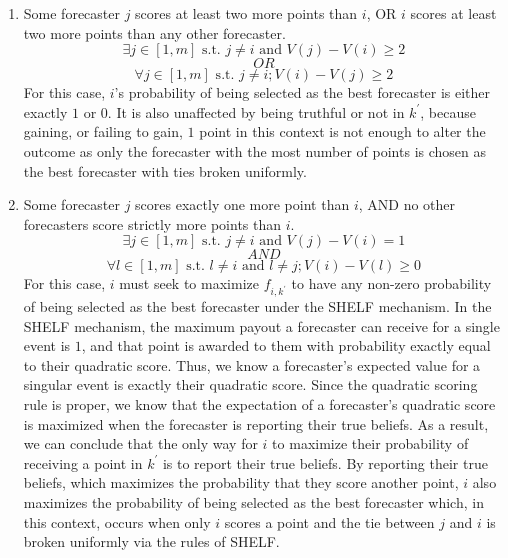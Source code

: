 \documentclass[letterpaper,12pt]{article}
\newcommand{\1}{\mathbbm{1}}
\begin{document}
\begin{enumerate}
    \item Some forecaster $j$ scores at least two more points than $i$, OR $i$ scores at least two more points than any other forecaster.\\
    $$\exists j \in [1,m] \text{ s.t. } j \ne i \text{ and } V(j) - V(i) \geq 2$$ 
    $$OR$$
    $$\forall j \in [1,m] \text{ s.t. } j \ne i; V(i) - V(j) \geq 2$$
    For this case, $i$'s probability of being selected as the best forecaster is either exactly $1$ or $0$. It is also unaffected by being truthful or not in $k^\prime$, because gaining, or failing to gain, $1$ point in this context is not enough to alter the outcome as only the forecaster with the most number of points is chosen as the best forecaster with ties broken uniformly.
    
    \item Some forecaster $j$ scores exactly one more point than $i$, AND no other forecasters score strictly more points than $i$.\\
    $$\exists j \in [1,m] \text{ s.t. } j \neq i \text{ and } V(j) - V(i) = 1$$
    $$AND$$
    $$\forall l \in [1,m] \text{ s.t. } l \neq i \text{ and } l \neq j; V(i) - V(l) \geq 0$$
    For this case, $i$ must seek to maximize $f_{i,k^\prime}$ to have any non-zero probability of being selected as the best forecaster under the SHELF mechanism. 
    In the SHELF mechanism, the maximum payout a forecaster can receive for a single event is $1$, and that point is awarded to them with probability exactly equal to their quadratic score. Thus, we know a forecaster's expected value for a singular event is exactly their quadratic score. Since the quadratic scoring rule is proper, we know that the expectation of a forecaster's quadratic score is maximized when the forecaster is reporting their true beliefs. As a result, we can conclude that the only way for $i$ to maximize their probability of receiving a point in $k^\prime$ is to report their true beliefs. By reporting their true beliefs, which maximizes the probability that they score another point, $i$ also maximizes the probability of being selected as the best forecaster which, in this context, occurs when only $i$ scores a point and the tie between $j$ and $i$ is broken uniformly via the rules of SHELF.
    

\end{enumerate}
\end{document}
